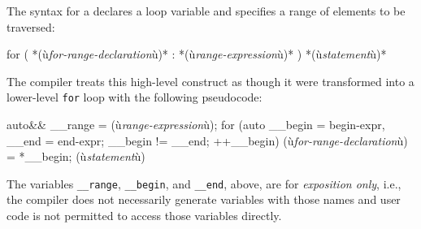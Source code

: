 The syntax for a  declares a loop
variable and specifies a range of elements to be traversed:


\begin{emcppslisting}[emcppsignore={grammar, not code, but leave as c++}]
for ( *(ù{\it{for-range-declaration}}ù)* : *(ù{\it{range-expression}}ù)* ) *(ù{\it{statement}}ù)*
\end{emcppslisting}
    

\noindent The compiler treats this high-level construct as though it were
transformed into a lower-level \lstinline!for! loop with the following
pseudocode:


\begin{emcppslisting}[emcppsignore={grammar, not code, but leave as c++}]
{
    auto&& __range = (ù{\it{range-expression}}ù);
    for (auto __begin = begin-expr, __end = end-expr;
        __begin != __end;
        ++__begin)
    {
        (ù{\it{for-range-declaration}}ù) = *__begin;
        (ù{\it{statement}}ù)
    }
}
\end{emcppslisting}
    

\noindent The variables \lstinline!__range!, \lstinline!__begin!, and
\lstinline!__end!, above, are for \emph{exposition only}, i.e., the
compiler does not necessarily generate variables with those names and
user code is not permitted to access those variables directly.

